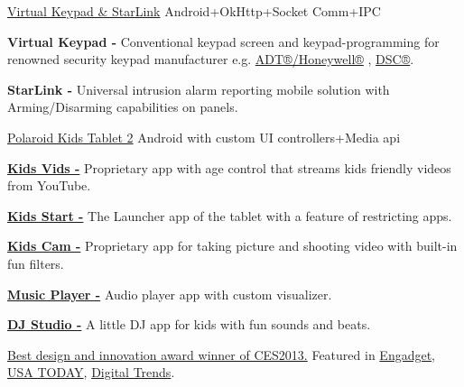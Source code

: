 \begin{projectentries}
    \projectentry 
    {\href{https://www.youtube.com/watch?v=_UDmZebYkEY}{Virtual Keypad \& StarLink} }
    {Android+OkHttp+Socket Comm+IPC}
    {
      \begin{projectitems} %
        \item {\textbf{Virtual Keypad - }Conventional keypad screen and keypad-programming for renowned security keypad manufacturer e.g. 
        {\href{https://www.security.honeywell.com/product-repository/6160v}{ADT®/Honeywell®}}
        , {\href{http://www.dsc.com/index.php?n=products&o=view&id=60}{DSC®}}.}
        \item {\textbf{StarLink - }Universal intrusion alarm reporting mobile solution with Arming/Disarming capabilities on panels.}
      \end{projectitems}
    }

    \projectentry 
    {\href{https://www.polaroid.com/kids-tablet-2}{Polaroid Kids Tablet 2}} 
    {Android with custom UI controllers+Media api}
    {
      \begin{projectitems} %
        \item {\href{https://youtu.be/7bRafa1btPA?t=94}{\textbf{Kids Vids -}} 
        Proprietary app with age control that streams kids friendly videos from YouTube.}
        \item {\href{https://youtu.be/7bRafa1btPA?t=7}{\textbf{Kids Start -}} 
        The Launcher app of the tablet with a feature of restricting apps.}
        \item {\href{https://youtu.be/7bRafa1btPA?t=120}{\textbf{Kids Cam -}} 
        Proprietary app for taking picture and shooting video with built-in fun filters.}
        \item {\href{https://youtu.be/7bRafa1btPA?t=146}{\textbf{Music Player -}} 
        Audio player app with custom visualizer.}
        \item {\href{https://youtu.be/7bRafa1btPA?t=146}{\textbf{DJ Studio -}} 
        A little DJ app for kids with fun sounds and beats.}
        \item {\href{https://www.androidauthority.com/polaroid-kids-tablet-149-99-144498/}{Best design and innovation award winner of CES2013.}
        Featured in
        {\href{https://www.engadget.com/2013/11/06/polaroid-kids-tablet-2/}{Engadget}, }
        {\href{https://www.usatoday.com/story/dispatches/2013/12/17/family-travel-gifts/4038309/}{USA TODAY}, }
        {\href{https://www.youtube.com/watch?v=WqLu0ru4xO8}{Digital Trends}.}
        }
      \end{projectitems}
    }


\end{projectentries}
